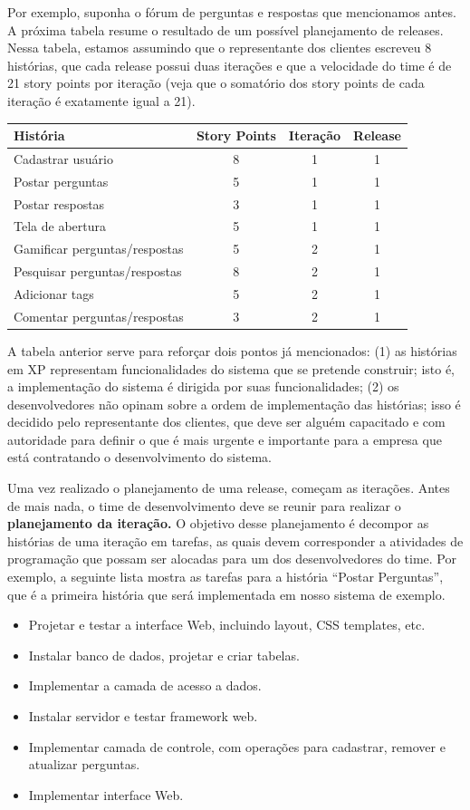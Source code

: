 \documentclass[
  11pt,
  twoside]{book}
\begin{document}
Por exemplo, suponha o fórum de perguntas e respostas que mencionamos
antes. A próxima tabela resume o resultado de um possível planejamento
de releases. Nessa tabela, estamos assumindo que o representante dos
clientes escreveu 8 histórias, que cada release possui duas iterações e
que a velocidade do time é de 21 story points por iteração (veja que o
somatório dos story points de cada iteração é exatamente igual a 21).

\begin{longtable}[]{@{}lccc@{}}
\toprule
\textbf{História} & \textbf{Story Points} & \textbf{Iteração} &
\textbf{Release}\tabularnewline
\midrule
\endhead
Cadastrar usuário & 8 & 1 & 1\tabularnewline
Postar perguntas & 5 & 1 & 1\tabularnewline
Postar respostas & 3 & 1 & 1\tabularnewline
Tela de abertura & 5 & 1 & 1\tabularnewline
Gamificar perguntas/respostas & 5 & 2 & 1\tabularnewline
Pesquisar perguntas/respostas & 8 & 2 & 1\tabularnewline
Adicionar tags & 5 & 2 & 1\tabularnewline
Comentar perguntas/respostas & 3 & 2 & 1\tabularnewline
\bottomrule
\end{longtable}

A tabela anterior serve para reforçar dois pontos já mencionados: (1) as
histórias em XP representam funcionalidades do sistema que se pretende
construir; isto é, a implementação do sistema é dirigida por suas
funcionalidades; (2) os desenvolvedores não opinam sobre a ordem de
implementação das histórias; isso é decidido pelo representante dos
clientes, que deve ser alguém capacitado e com autoridade para definir o
que é mais urgente e importante para a empresa que está contratando o
desenvolvimento do sistema.

Uma vez realizado o planejamento de uma release, começam as iterações.
Antes de mais nada, o time de desenvolvimento deve se reunir para
realizar o \textbf{planejamento da iteração.} O objetivo desse
planejamento é decompor as histórias de uma iteração em tarefas, as
quais devem corresponder a atividades de programação que possam ser
alocadas para um dos desenvolvedores do time. Por exemplo, a seguinte
lista mostra as tarefas para a história ``Postar Perguntas'', que é a
primeira história que será implementada em nosso sistema de exemplo.

\begin{itemize}
\item
  Projetar e testar a interface Web, incluindo layout, CSS templates,
  etc.
\item
  Instalar banco de dados, projetar e criar tabelas.
\item
  Implementar a camada de acesso a dados.
\item
  Instalar servidor e testar framework web.
\item
  Implementar camada de controle, com operações para cadastrar, remover
  e atualizar perguntas.
\item
  Implementar interface Web.
\end{itemize}
\end{document}
